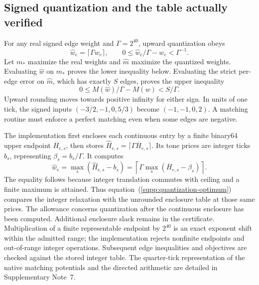 \documentclass[10pt,letterpaper]{article}
\begin{document}
\subsection{Signed quantization and the table actually verified}
For any real signed edge weight and $\Gamma=2^{40}$, upward quantization obeys
\begin{equation}
 \widehat w_e=\lceil\Gamma w_e\rceil,
 \qquad 0\le\widehat w_e/\Gamma-w_e<\Gamma^{-1}.
 \label{supp:quantization}
\end{equation}
Let $m_*$ maximize the real weights and $\widehat m$ maximize the quantized weights. Evaluating $\widehat w$ on $m_*$ proves the lower inequality below. Evaluating the strict per-edge error on $\widehat m$, which has exactly $S$ edges, proves the upper inequality
\begin{equation}
 0\le M(\widehat w)/\Gamma-M(w)<S/\Gamma.
 \label{supp:quantization-optimum}
\end{equation}
Upward rounding moves towards positive infinity for either sign. In units of one tick, the signed inputs $(-3/2,-1,0,5/3)$ become $(-1,-1,0,2)$. A matching routine must enforce a perfect matching even when some edges are negative.

The implementation first encloses each continuous entry by a finite binary64 upper endpoint $\overline H_{e,s}$, then stores $\widehat H_{e,s}=\lceil\Gamma\overline H_{e,s}\rceil$. Its tone prices are integer ticks $b_s$, representing $\beta_s=b_s/\Gamma$. It computes
\begin{equation}
 \widehat w_e=\max_s(\widehat H_{e,s}-b_s)
 =\left\lceil\Gamma\max_s(\overline H_{e,s}-\beta_s)\right\rceil.
 \label{supp:table-quantization}
\end{equation}
The equality follows because integer translation commutes with ceiling and a finite maximum is attained. Thus equation~(\ref{supp:quantization-optimum}) compares the integer relaxation with the unrounded enclosure table at those same prices. The allowance concerns quantization after the continuous enclosure has been computed. Additional enclosure slack remains in the certificate. Multiplication of a finite representable endpoint by $2^{40}$ is an exact exponent shift within the admitted range; the implementation rejects nonfinite endpoints and out-of-range integer operations. Subsequent edge inequalities and objectives are checked against the stored integer table. The quarter-tick representation of the native matching potentials and the directed arithmetic are detailed in Supplementary Note~7.
\end{document}
